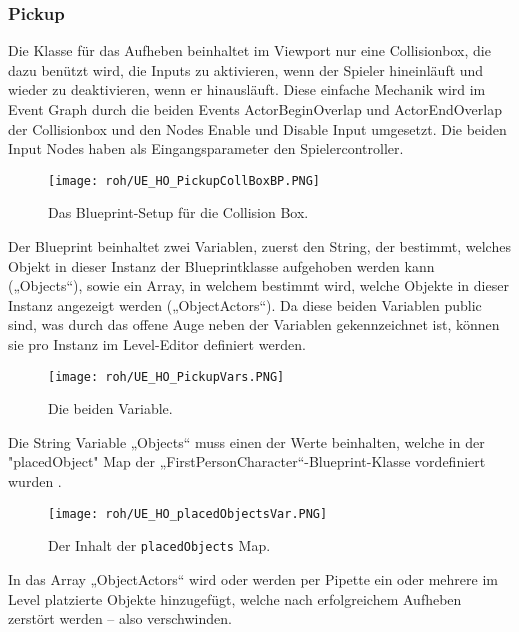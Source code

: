 \subsubsection{Pickup}
Die Klasse für das Aufheben beinhaltet im Viewport nur eine Collisionbox, die dazu benützt wird, die Inputs zu aktivieren, wenn der Spieler hineinläuft und wieder zu deaktivieren, wenn er hinausläuft. Diese einfache Mechanik wird im Event Graph durch die beiden Events ActorBeginOverlap und ActorEndOverlap der Collisionbox und den Nodes Enable und Disable Input umgesetzt. Die beiden Input Nodes haben als Eingangsparameter den Spielercontroller.
\begin{figure}[H]
    \texttt{[image: roh/UE\_HO\_PickupCollBoxBP.PNG]}%
    \caption{Das Blueprint-Setup für die Collision Box.}
    \label{UE:HO_PickupCollBox}
\end{figure}
Der Blueprint beinhaltet zwei Variablen, zuerst den String, der bestimmt, welches Objekt in dieser Instanz der Blueprintklasse aufgehoben werden kann („Objects“), sowie ein Array, in welchem bestimmt wird, welche Objekte in dieser Instanz angezeigt werden („ObjectActors“). Da diese beiden Variablen public sind, was durch das offene Auge neben der Variablen gekennzeichnet ist, können sie pro Instanz im Level-Editor definiert werden.
\begin{figure}[H]
    \centering
    \texttt{[image: roh/UE\_HO\_PickupVars.PNG]}
    \caption{Die beiden Variable.}
    \label{UE:HO_PickupVars}
\end{figure}
Die String Variable „Objects“ muss einen der Werte beinhalten, welche in der "placedObject" Map der „FirstPersonCharacter“-Blueprint-Klasse vordefiniert wurden .
\begin{figure}[H]
    \centering
    \texttt{[image: roh/UE\_HO\_placedObjectsVar.PNG]}
    \caption{Der Inhalt der {\tt placedObjects} Map.}
    \label{UE:HO_placedObjectsVar}
\end{figure}
In das Array „ObjectActors“ wird oder werden per Pipette ein oder mehrere im Level platzierte Objekte hinzugefügt, welche nach erfolgreichem Aufheben zerstört werden – also verschwinden.

